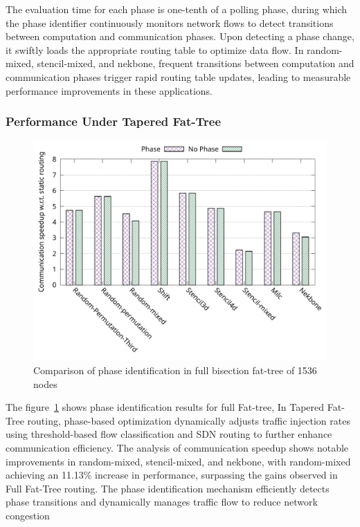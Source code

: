 The evaluation time for each phase is one-tenth of a polling phase, during which the phase identifier continuously monitors network flows to detect transitions between computation and communication phases. Upon detecting a phase change, it swiftly loads the appropriate routing table to optimize data flow. In random-mixed, stencil-mixed, and nekbone, frequent transitions between computation and communication phases trigger rapid routing table updates, leading to measurable performance improvements in these applications.


\subsubsection{Performance Under Tapered Fat-Tree}
\begin{figure}[h]
  \centering
  \includegraphics[width=\columnwidth]{./figs_4/phase_taper.pdf}
  \caption{Comparison of phase identification in full bisection fat-tree of 1536 nodes}
  \label{fig:phase_taper}
\end{figure}
The figure~\ref{fig:phase_taper} shows phase identification results for full Fat-tree,
In Tapered Fat-Tree routing, phase-based optimization dynamically adjusts traffic injection rates using threshold-based flow classification and SDN routing to further enhance communication efficiency. The analysis of communication speedup shows notable improvements in random-mixed, stencil-mixed, and nekbone, with random-mixed achieving an 11.13\% increase in performance, surpassing the gains observed in Full Fat-Tree routing. The phase identification mechanism efficiently detects phase transitions and dynamically manages traffic flow to reduce network congestion

